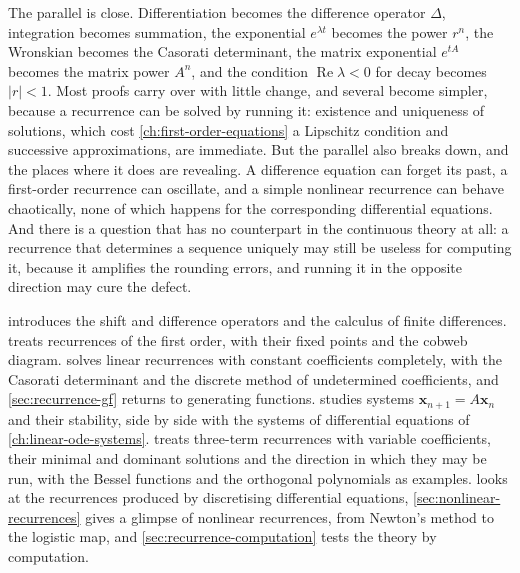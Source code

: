 The parallel is close. Differentiation becomes the difference operator $\Delta$, integration becomes summation, the exponential $e^{\lambda t}$ becomes the power $r^n$, the Wronskian becomes the Casorati determinant, the matrix exponential $e^{tA}$ becomes the matrix power $A^n$, and the condition $\operatorname{Re}\lambda<0$ for decay becomes $|r|<1$. Most proofs carry over with little change, and several become simpler, because a recurrence can be solved by running it: existence and uniqueness of solutions, which cost \cref{ch:first-order-equations} a Lipschitz condition and successive approximations, are immediate. But the parallel also breaks down, and the places where it does are revealing. A difference equation can forget its past, a first-order recurrence can oscillate, and a simple nonlinear recurrence can behave chaotically, none of which happens for the corresponding differential equations. And there is a question that has no counterpart in the continuous theory at all: a recurrence that determines a sequence uniquely may still be useless for computing it, because it amplifies the rounding errors, and running it in the opposite direction may cure the defect.

 introduces the shift and difference operators and the calculus of finite differences.  treats recurrences of the first order, with their fixed points and the cobweb diagram.  solves linear recurrences with constant coefficients completely, with the Casorati determinant and the discrete method of undetermined coefficients, and \cref{sec:recurrence-gf} returns to generating functions.  studies systems $\mathbf x_{n+1}=A\mathbf x_n$ and their stability, side by side with the systems of differential equations of \cref{ch:linear-ode-systems}.  treats three-term recurrences with variable coefficients, their minimal and dominant solutions and the direction in which they may be run, with the Bessel functions and the orthogonal polynomials as examples.  looks at the recurrences produced by discretising differential equations, \cref{sec:nonlinear-recurrences} gives a glimpse of nonlinear recurrences, from Newton's method to the logistic map, and \cref{sec:recurrence-computation} tests the theory by computation.

